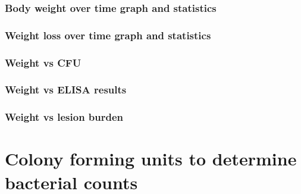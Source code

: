 \documentclass[
]{book}
\newenvironment{Shaded}{\begin{snugshade}}{\end{snugshade}}
\newcommand{\CommentTok}[1]{\textcolor[rgb]{0.56,0.35,0.01}{\textit{#1}}}
\newcommand{\FunctionTok}[1]{\textcolor[rgb]{0.00,0.00,0.00}{#1}}
\newcommand{\NormalTok}[1]{#1}
\newcommand{\OtherTok}[1]{\textcolor[rgb]{0.56,0.35,0.01}{#1}}
\newcommand{\SpecialCharTok}[1]{\textcolor[rgb]{0.00,0.00,0.00}{#1}}
\newcommand{\StringTok}[1]{\textcolor[rgb]{0.31,0.60,0.02}{#1}}
\begin{document}
\begin{Shaded}
\end{Shaded}

\hypertarget{body-weight-over-time-graph-and-statistics}{%
\subsection{Body weight over time graph and statistics}\label{body-weight-over-time-graph-and-statistics}}

\hypertarget{weight-loss-over-time-graph-and-statistics}{%
\subsection{Weight loss over time graph and statistics}\label{weight-loss-over-time-graph-and-statistics}}

\hypertarget{weight-vs-cfu}{%
\subsection{Weight vs CFU}\label{weight-vs-cfu}}

\hypertarget{weight-vs-elisa-results}{%
\subsection{Weight vs ELISA results}\label{weight-vs-elisa-results}}

\hypertarget{weight-vs-lesion-burden}{%
\subsection{Weight vs lesion burden}\label{weight-vs-lesion-burden}}

\hypertarget{colony-forming-units-to-determine-bacterial-counts}{%
\chapter{Colony forming units to determine bacterial counts}\label{colony-forming-units-to-determine-bacterial-counts}}
\end{document}
